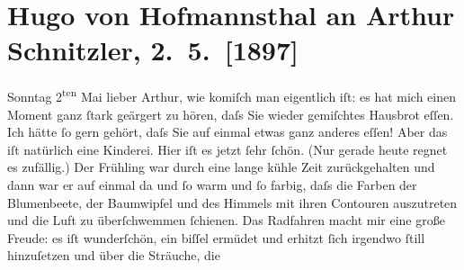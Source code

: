 

               \section[Hugo von Hofmannsthal an Arthur Schnitzler, 2. 5. {[}1897{]}]{ Hugo von Hofmannsthal an Arthur Schnitzler, 2. 5. {[}1897{]}}\nopagebreak{}\rehead{ }\normalsize\beginnumbering{} \toendnotes[C]{\smallbreak\pagebreak[2]} 
\toendnotes[C]{\smallbreak}\pstart
           \noindent{}{\pb}\textcolor{gray}{\textbf{\label{T_L00673-1v}\label{T_L00673-1h}}}\pend
           \pstart
           \raggedleft{}Sonntag 2\textsuperscript{ten} Mai\pend
           \pstart{}lieber Arthur,\pend\pstart
           wie komiſch man eigentlich iſt: es hat mich einen Moment ganz ſtark geärgert zu
                    hören, daſs Sie wieder gemiſchtes Hausbrot eſſen. Ich hätte ſo gern gehört, daſs
                    Sie auf einmal etwas ganz anderes eſſen! Aber das iſt natürlich eine
                    Kinderei.\pend
           \pstart
           Hier iſt es jetzt ſehr ſchön. (Nur gerade heute regnet es zufällig.) Der Frühling
                    war {\pb}durch eine lange kühle
                    Zeit zurückgehalten und dann war er auf einmal da und ſo warm und ſo farbig,
                    daſs die Farben der Blumenbeete, der Baumwipfel und des Himmels mit ihren
                    Contouren auszutreten und die Luft zu überſchwemmen ſchienen. Das Radfahren
                    macht mir eine große Freude: es iſt wunderſchön, ein biſſel ermüdet und erhitzt
                    ſich irgendwo ſtill hinzuſetzen {\pb}und über die Sträuche, die
